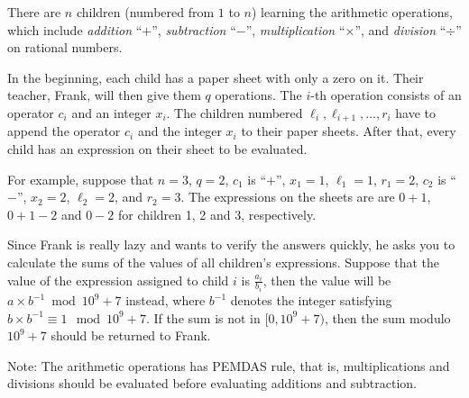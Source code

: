 There are $n$ children (numbered from $1$ to $n$) learning
the arithmetic operations, which include \emph{addition} ``$+$'', 
\emph{subtraction} ``$-$'', 
\emph{multiplication} ``$\times$'', and \emph{division} ``$\div$'' on 
rational numbers.

In the beginning, each child has a paper sheet with only a zero on it. 
Their teacher, Frank, will then give them $q$ operations. 
The $i$-th operation consists of an operator $c_i$ and an integer $x_i$.
The children numbered $\ell_i,\ell_{i+1},\dots,r_i$ have to append the 
operator $c_i$ and the integer $x_i$ to their paper sheets.
After that, every child has an expression on their sheet to be evaluated.

For example, suppose that $n=3$, $q=2$, $c_1$ is ``$+$'', $x_1=1$, $\ell_1=1$, 
$r_1=2$, $c_2$ is ``$-$'',  $x_2=2$, $\ell_2=2$, and $r_2=3$. 
The expressions on the sheets are are $0+1$, $0+1-2$ and $0-2$ for 
children 1, 2 and 3, respectively.

Since Frank is really lazy and wants to verify the answers quickly,
he asks you to calculate the sums of the values of all children's 
expressions. 
Suppose that the value of the expression assigned to child $i$ is 
$\frac{a_i}{b_i}$, 
then the value will be $a\times b^{-1}\bmod 10^9+7$ instead, 
where $b^{-1}$ denotes the integer satisfying 
$b\times b^{-1}\equiv 1\mod 10^9+7$. 
If the sum is not in $[0, 10^9+7)$, then the sum modulo $10^9+7$ should be
returned to Frank.

Note: The arithmetic operations has PEMDAS rule, that is, 
multiplications and divisions should be evaluated before evaluating additions
and subtraction.
